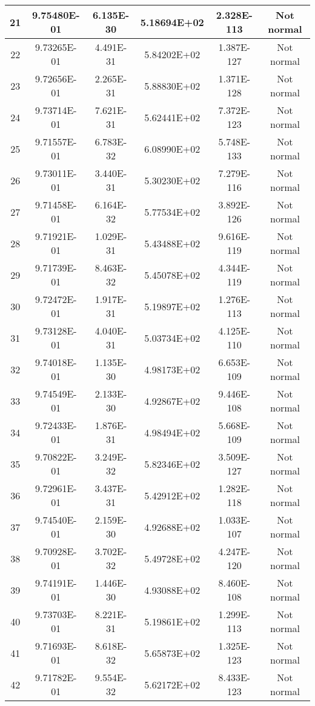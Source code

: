 \begin{table}[h]
\begin{tabular}{|c|c|c|c|c|c|}
		21 & 9.75480E-01 & 6.135E-30 & 5.18694E+02 & 2.328E-113 & Not normal\\\hline
		22 & 9.73265E-01 & 4.491E-31 & 5.84202E+02 & 1.387E-127 & Not normal\\\hline
		23 & 9.72656E-01 & 2.265E-31 & 5.88830E+02 & 1.371E-128 & Not normal\\\hline
		24 & 9.73714E-01 & 7.621E-31 & 5.62441E+02 & 7.372E-123 & Not normal\\\hline
		25 & 9.71557E-01 & 6.783E-32 & 6.08990E+02 & 5.748E-133 & Not normal\\\hline
		26 & 9.73011E-01 & 3.440E-31 & 5.30230E+02 & 7.279E-116 & Not normal\\\hline
		27 & 9.71458E-01 & 6.164E-32 & 5.77534E+02 & 3.892E-126 & Not normal\\\hline
		28 & 9.71921E-01 & 1.029E-31 & 5.43488E+02 & 9.616E-119 & Not normal\\\hline
		29 & 9.71739E-01 & 8.463E-32 & 5.45078E+02 & 4.344E-119 & Not normal\\\hline
		30 & 9.72472E-01 & 1.917E-31 & 5.19897E+02 & 1.276E-113 & Not normal\\\hline
		31 & 9.73128E-01 & 4.040E-31 & 5.03734E+02 & 4.125E-110 & Not normal\\\hline
		32 & 9.74018E-01 & 1.135E-30 & 4.98173E+02 & 6.653E-109 & Not normal\\\hline
		33 & 9.74549E-01 & 2.133E-30 & 4.92867E+02 & 9.446E-108 & Not normal\\\hline
		34 & 9.72433E-01 & 1.876E-31 & 4.98494E+02 & 5.668E-109 & Not normal\\\hline
		35 & 9.70822E-01 & 3.249E-32 & 5.82346E+02 & 3.509E-127 & Not normal\\\hline
		36 & 9.72961E-01 & 3.437E-31 & 5.42912E+02 & 1.282E-118 & Not normal\\\hline
		37 & 9.74540E-01 & 2.159E-30 & 4.92688E+02 & 1.033E-107 & Not normal\\\hline
		38 & 9.70928E-01 & 3.702E-32 & 5.49728E+02 & 4.247E-120 & Not normal\\\hline
		39 & 9.74191E-01 & 1.446E-30 & 4.93088E+02 & 8.460E-108 & Not normal\\\hline
		40 & 9.73703E-01 & 8.221E-31 & 5.19861E+02 & 1.299E-113 & Not normal\\\hline
		41 & 9.71693E-01 & 8.618E-32 & 5.65873E+02 & 1.325E-123 & Not normal\\\hline
		42 & 9.71782E-01 & 9.554E-32 & 5.62172E+02 & 8.433E-123 & Not normal\\\hline

\end{tabular}
\end{table}
